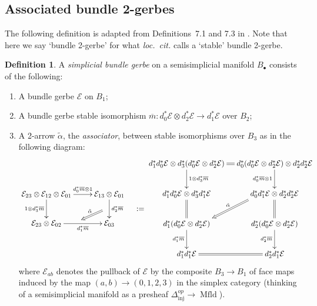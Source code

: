 \documentclass[12pt]{amsart}
\DeclareMathOperator{\Mfld}{Mfld}
\theoremstyle{plain}
\theoremstyle{definition}
\newtheorem{definition}[theorem]{Definition}
\theoremstyle{remark}
\numberwithin{equation}{section}
\newcommand{\cE}{{\mathcal E}}
\newcommand{\<}{\langle}
\renewcommand{\>}{\rangle}
\begin{document}
\subsection{Associated bundle 2-gerbes}

The following definition is adapted from Definitions~7.1 and 7.3 in \cite{StevPhD}. 
Note that here we say `bundle 2-gerbe' for what \emph{loc.\ cit.} calls a `stable' bundle 2-gerbe.

\begin{definition}\label{def:bundle2gerbe}
A \emph{simplicial bundle gerbe} on a semisimplicial manifold $B_\bullet$ consists of the following:
\begin{enumerate}
\item A bundle gerbe $\mathcal{E}$ on $B_1$;
\item A bundle gerbe stable isomorphism $\overline{m}\colon d_0^*\cE \otimes d_2^*\cE \to d_1^*\cE$ over $B_2$;
\item A 2-arrow $\tilde \alpha$, the \emph{associator}, between stable isomorphisms over $B_3$ as in the following diagram: 
\[
	\begin{gathered}
	\xymatrix{
	\cE_{23}\otimes \cE_{12}\otimes \cE_{01} \ar[d]_{1\otimes d_3^*\overline{m}} \ar[r]^-{d_0^*\overline{m}\otimes 1} & 
	\cE_{13}\otimes \cE_{01} \ar[d]_{\ }="s"^-{d_2^*\overline{m}}
	\\
	\cE_{23}\otimes \cE_{02} \ar[r]^{\ }="t"_-{d_1^*\overline{m}}
	 & \cE_{03}
	\ar@{=>}"s";"t"_{\tilde \alpha}
	}
	\end{gathered}
	\quad :=
	\begin{gathered}
\xymatrix@C=1em{
			d_1^*d_0^*\cE\otimes d_3^*(d_0^*\cE\otimes d_2^*\cE) 
			\ar[d]^{1\otimes d_3^*\overline{m}}
			\ar@{=}[r] 
			& 
			d_0^*(d_0^*\cE\otimes d_2^*\cE)\otimes d_2^*d_2^*\cE 
			\ar[d]_{d_0^*\overline{m}\otimes 1} 
			\\
			d_1^*d_0^*\cE\otimes d_3^* d_1^*\cE 
			\ar@{=}[d]
			& 
			d_0^*d_1^*\cE\otimes d_2^*d_2^*\cE
			\ar@{=}[d]
			\ar@{=>}[]!DL;[dl]!UR_{\tilde \alpha}
			\\
			d_1^*(d_0^*\cE\otimes d_2^*\cE)
			\ar[d]_{d_1^*\overline{m}}
			&
			d_2^*(d_0^*\cE \otimes d_2^*\cE)
			\ar[d]_{d_2^*\overline{m}}
			\\
	d_1^*d_1^*\cE \ar@{=}[r] &  d_2^*d_1^*\cE
	}
		\end{gathered}
\]
where $\cE_{ab}$ denotes the pullback of $\cE$ by the composite $B_3\to B_1$ of face maps induced by the map $(a,b)\to (0,1,2,3)$ in the simplex category (thinking of a semisimplicial manifold as a presheaf $\Delta^{op}_{\mathrm{inj}} \to \Mfld$).


\end{enumerate}
\end{definition}
\end{document}
